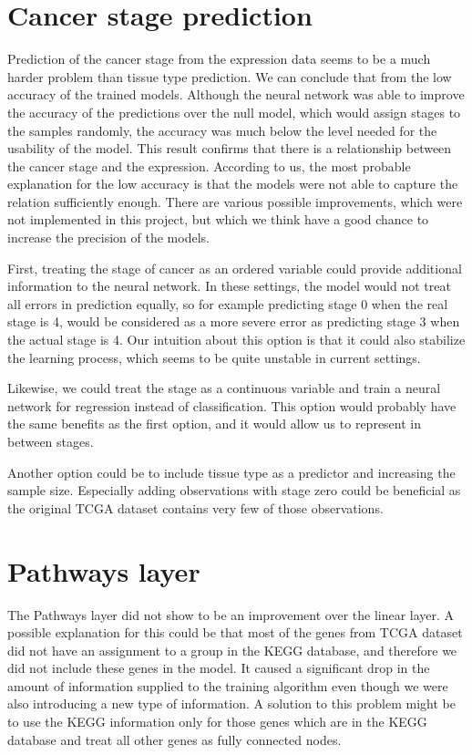 \section{Cancer stage prediction}
Prediction of the cancer stage from the expression data seems to be a much harder problem than tissue type prediction.
We can conclude that from the low accuracy of the trained models.
Although the neural network was able to improve the accuracy of the predictions over the null model, which would assign stages to the samples randomly, the accuracy was much below the level needed for the usability of the model.
This result confirms that there is a relationship between the cancer stage and the expression.
According to us, the most probable explanation for the low accuracy is that the models were not able to capture the relation sufficiently enough.
There are various possible improvements, which were not implemented in this project, but which we think have a good chance to increase the precision of the models.

First, treating the stage of cancer as an ordered variable could provide additional information to the neural network.
In these settings, the model would not treat all errors in prediction equally, so for example predicting stage 0 when the real stage is 4, would be considered as a more severe error as predicting stage 3 when the actual stage is 4.
Our intuition about this option is that it could also stabilize the learning process, which seems to be quite unstable in current settings.

Likewise, we could treat the stage as a continuous variable and train a neural network for regression instead of classification.
This option would probably have the same benefits as the first option, and it would allow us to represent in between stages.

Another option could be to include tissue type as a predictor and increasing the sample size.
Especially adding observations with stage zero could be beneficial as the original TCGA dataset contains very few of those observations.

\section{Pathways layer}
The Pathways layer did not show to be an improvement over the linear layer.
A possible explanation for this could be that most of the genes from TCGA dataset did not have an assignment to a group in the KEGG database, and therefore we did not include these genes in the model.
It caused a significant drop in the amount of information supplied to the training algorithm even though we were also introducing a new type of information.
A solution to this problem might be to use the KEGG information only for those genes which are in the KEGG database and treat all other genes as fully connected nodes.
